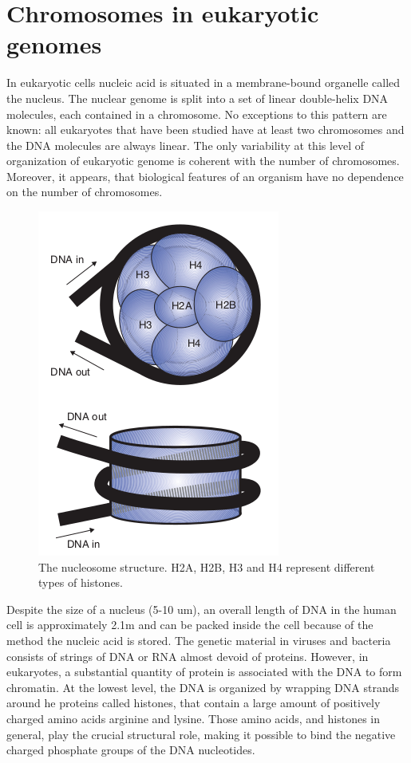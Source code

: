 \section{Chromosomes in eukaryotic genomes}

In eukaryotic cells nucleic acid is situated in a membrane-bound organelle called the nucleus. The nuclear genome is split into a set of linear double-helix DNA molecules, each contained in a chromosome. No exceptions to this pattern are known: all eukaryotes that have been studied have at least two chromosomes and the DNA molecules are always linear. The only variability at this level of organization of eukaryotic genome is coherent with the number of chromosomes. Moreover, it appears, that biological features of an organism have no dependence on the number of chromosomes. 

\begin{figure}[!ht]
	\centering
	\includegraphics[width=.5\textwidth]{figures/nucleoDetailed}
	\caption{The nucleosome structure. H2A, H2B, H3 and H4 represent different types of histones. \label{o:latex_friendly_zone}}
\end{figure}

Despite the size of a nucleus (5-10 um), an overall length of DNA in the human cell is approximately 2.1m and can be packed inside the cell because of the method the nucleic acid is stored. The genetic material in viruses and bacteria consists of strings of DNA or RNA almost devoid of proteins. However, in eukaryotes, a substantial quantity of protein is associated with the DNA to form chromatin. At the lowest level, the DNA is organized by wrapping DNA strands around he proteins called histones, that contain a large amount of positively charged amino acids arginine and lysine. Those amino acids, and histones in general, play the crucial structural role, making it possible to bind the negative charged phosphate groups of the DNA nucleotides.

